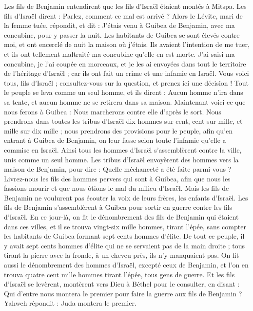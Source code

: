 \begin{multicols}{2}
Les fils de Benjamin entendirent que les fils d'Israël étaient montés à Mitspa. Les fils d'Israël dirent : Parlez, comment ce mal est arrivé ?
Alors le Lévite, mari de la femme tuée, répondit, et dit : J'étais venu à Guibea de Benjamin, avec ma concubine, pour y passer la nuit.
Les habitants de Guibea se sont élevés contre moi, et ont encerclé de nuit la maison où j'étais. Ils avaient l'intention de me tuer, et ils ont tellement maltraité ma concubine qu'elle en est morte.
J'ai saisi ma concubine, je l'ai coupée en morceaux, et je les ai envoyées dans tout le territoire de l'héritage d'Israël ; car ils ont fait un crime et une infamie en Israël.
Vous voici tous, fils d'Israël ; consultez-vous sur la question, et prenez ici une décision !
Tout le peuple se leva comme un seul homme, et ils dirent : Aucun homme n'ira dans sa tente, et aucun homme ne se retirera dans sa maison.
Maintenant voici ce que nous ferons à Guibea : Nous marcherons contre elle d'après le sort.
Nous prendrons dans toutes les tribus d'Israël dix hommes sur cent, cent sur mille, et mille sur dix mille ; nous prendrons des provisions pour le peuple, afin qu'en entrant à Guibea de Benjamin, on leur fasse selon toute l'infamie qu'elle a commise en Israël.
Ainsi tous les hommes d'Israël s'assemblèrent contre la ville, unis comme un seul homme.
Les tribus d'Israël envoyèrent des hommes vers la maison de Benjamin, pour dire : Quelle méchanceté a été faite parmi vous ?
Livrez-nous les fils des hommes pervers qui sont à Guibea, afin que nous les fassions mourir et que nous ôtions le mal du milieu d'Israël. Mais les fils de Benjamin ne voulurent pas écouter la voix de leurs frères, les enfants d'Israël.
Les fils de Benjamin s'assemblèrent à Guibea pour sortir en guerre contre les fils d'Israël.
En ce jour-là, on fit le dénombrement des fils de Benjamin qui étaient dans ces villes, et il se trouva vingt-six mille hommes, tirant l'épée, sans compter les habitants de Guibea formant sept cents hommes d'élite.
De tout ce peuple, il y avait sept cents hommes d'élite qui ne se servaient pas de la main droite ; tous tirant la pierre avec la fronde,  à un cheveu près,  ils n'y manquaient pas.
On fit aussi le dénombrement des hommes d'Israël, excepté ceux de Benjamin, et l'on en trouva quatre cent mille hommes tirant l'épée, tous gens de guerre.
Et les fils d'Israël se levèrent, montèrent vers Dieu à Béthel pour le consulter, en disant : Qui d'entre nous montera le premier pour faire la guerre aux fils de Benjamin ? Yahweh répondit : Juda montera le premier.

\end{multicols}
